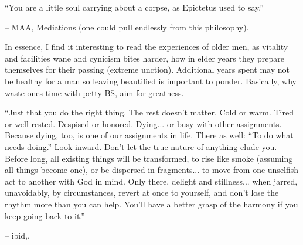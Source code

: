 \begin{footnotesize}
\begin{sffamily}
``You are a little soul carrying about a corpse, as Epictetus used to say.''

-- MAA, Mediations (one could pull endlessly from this philosophy).

In essence, I find it interesting to read the experiences of older men, as vitality and facilities wane and cynicism bites harder, how in elder years they prepare themselves for their passing (extreme unction). Additional years spent may not be healthy for a man so leaving beautified is important to ponder. Basically, why waste ones time with petty BS, aim for greatness.

``Just that you do the right thing. The rest doesn't matter. Cold or warm. Tired or well-rested. Despised or honored. Dying... or busy with other assignments. Because dying, too, is one of our assignments in life. There as well: ``To do what needs doing.'' Look inward. Don't let the true nature of anything elude you. Before long, all existing things will be transformed, to rise like smoke (assuming all things become one), or be dispersed in fragments... to move from one unselfish act to another with God in mind. Only there, delight and stillness... when jarred, unavoidably, by circumstances, revert at once to yourself, and don't lose the rhythm more than you can help. You'll have a better grasp of the harmony if you keep going back to it.''

-- ibid,.

\end{sffamily}
\end{footnotesize}

